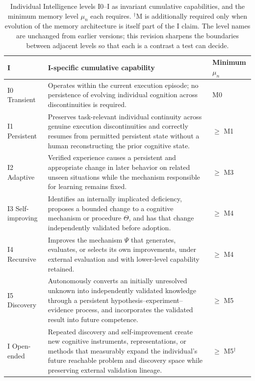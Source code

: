 \begin{table}[!htbp]
\centering\small
\begin{tabularx}{\textwidth}{@{}lY>{\raggedright\arraybackslash}p{2.1cm}@{}}
\toprule
I & I-specific cumulative capability & Minimum $\mu_n$ \\
\midrule
I0 Transient & Operates within the current execution episode; no persistence of evolving individual cognition across discontinuities is required. & M0 \\
I1 Persistent & Preserves task-relevant individual continuity across genuine execution discontinuities and correctly resumes from permitted persistent state without a human reconstructing the prior cognitive state. & $\ge$ M1 \\
I2 Adaptive & Verified experience causes a persistent and appropriate change in later behavior on related unseen situations while the mechanism responsible for learning remains fixed. & $\ge$ M3 \\
I3 Self-improving & Identifies an internally implicated deficiency, proposes a bounded change to a cognitive mechanism or procedure $\Theta$, and has that change independently validated before adoption. & $\ge$ M4 \\
I4 Recursive & Improves the mechanism $\Psi$ that generates, evaluates, or selects its own improvements, under external evaluation and with lower-level capability retained. & $\ge$ M4 \\
I5 Discovery & Autonomously converts an initially unresolved unknown into independently validated knowledge through a persistent hypothesis--experiment--evidence process, and incorporates the validated result into future competence. & $\ge$ M5 \\
I\Om{} Open-ended & Repeated discovery and self-improvement create new cognitive instruments, representations, or methods that measurably expand the individual's future reachable problem and discovery space while preserving external validation lineage. & $\ge$ M5$^{\dagger}$ \\
\bottomrule
\end{tabularx}
\caption{Individual Intelligence levels I0--I\Om{} as invariant cumulative capabilities, and the minimum memory level $\mu_n$ each requires. $^{\dagger}$M\Om{} is additionally required only when evolution of the memory architecture is itself part of the I\Om{} claim. The level names are unchanged from earlier versions; this revision sharpens the boundaries between adjacent levels so that each is a contrast a test can decide.}
\label{tab:i}
\end{table}

